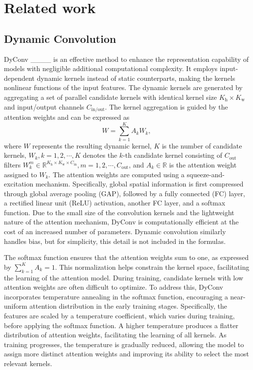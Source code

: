 \section{Related work \label{sec2}
}
\subsection{Dynamic Convolution \label{sec2.1}}
DyConv ____ is an effective method to enhance the representation capability of models with negligible additional computational complexity. It employs input-dependent dynamic kernels instead of static counterparts, making the kernels nonlinear functions of the input features. The dynamic kernels are generated by aggregating a set of parallel candidate kernels with identical kernel size $K_\text{h} \times K_\text{w}$ and input/output channels  $C_{\text{in/out}}$. The kernel aggregation is guided by the attention weights and can be expressed as
\begin{equation}
    W = \sum_{k=1}^{K} A_k W_k,
    \label{eq.1}
\end{equation}
where $W$ represents the resulting dynamic kernel, $K$ is the number of candidate kernels, $W_k, k=1,2,\cdots,K$ denotes the $k$-th candidate kernel consisting of $C_{\text{out}}$ filters $W_k^m \in \mathbb{R}^{K_\text{h} \times K_\text{w} \times C_{\text{in}}}, m=1,2,\cdots,C_{\text{out}}$, and $A_k \in \mathbb{R}$ is the attention weight assigned to $W_k$. The attention weights are computed using a squeeze-and-excitation mechanism. Specifically, global spatial information is first compressed through global average pooling (GAP), followed by a fully connected (FC) layer, a rectified linear unit (ReLU) activation, another FC layer, and a softmax function. Due to the small size of the convolution kernels and the lightweight nature of the attention mechanism, DyConv is computationally efficient at the cost of an increased number of parameters. Dynamic convolution similarly handles bias, but for simplicity, this detail is not included in the formulas.

The softmax function ensures that the attention weights sum to one, as expressed by $\sum_{k=1}^{K} A_k = 1$. This normalization helps constrain the kernel space, facilitating the learning of the attention model. During training, candidate kernels with low attention weights are often difficult to optimize. To address this, DyConv incorporates temperature annealing in the softmax function, encouraging a near-uniform attention distribution in the early training stages. Specifically, the features are scaled by a temperature coefficient, which varies during training, before applying the softmax function. A higher temperature produces a flatter distribution of attention weights, facilitating the learning of all kernels. As training progresses, the temperature is gradually reduced, allowing the model to assign more distinct attention weights and improving its ability to select the most relevant kernels.


